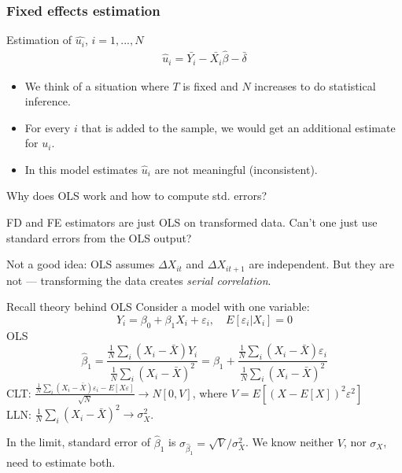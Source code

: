 \documentclass[notes=show,beamer,compress]{beamer}
\begin{document}

\begin{frame}
\frametitle{Fixed effects estimation}

Estimation of $\hat{u_{i}}$, $i=1,...,N$
\begin{eqnarray*}
\hat{u}_{i}=\bar{Y_i}-\bar{X_i}\hat{\beta}-\bar{\delta}
\end{eqnarray*}

\begin{itemize}
\item We think of a situation where $T$ is fixed and $N$ increases to do statistical inference.
\item For every $i$ that is added to the sample, we would get an additional estimate for $u_i$.
\item In this model estimates $\hat{u}_{i}$ are not meaningful (inconsistent).
\end{itemize}
\end{frame}


\begin{frame}{Why does OLS work and how to compute std. errors?}

FD and FE estimators are just OLS on transformed data. Can't one just use standard errors from the OLS output?\\\bigskip

Not a good idea: OLS assumes $\Delta{}X_{it}$ and $\Delta{}X_{it+1}$ are independent. But they are not --- transforming the data creates \emph{serial correlation}.

\end{frame}

\begin{frame}{Recall theory behind OLS}
Consider a model with one variable:
\begin{equation*}
	Y_i = \beta_0 + \beta_1X_i + \varepsilon_i, \quad E[\varepsilon_i|X_i]=0
\end{equation*}
OLS
\begin{equation*}
	\widehat\beta_1 = \frac{\frac{1}{N}\sum_i(X_i - \bar{X})Y_i}{\frac{1}{N}\sum_i(X_i - \bar{X})^2} = \beta_1 + \frac{\frac{1}{N}\sum_i(X_i - \bar{X})\varepsilon_i}{\frac{1}{N}\sum_i(X_i - \bar{X})^2}
\end{equation*}
CLT: $\frac{\frac{1}{N}\sum_i(X_i - \bar{X})\varepsilon_i - E[X\varepsilon]}{\sqrt{N}} \to N[0, V]$, where $V = E[(X-E[X])^2\varepsilon^2]$\\
LLN: $\frac{1}{N}\sum_i(X_i - \bar{X})^2 \to \sigma^2_X$.\\\bigskip

In the limit, standard error of $\widehat\beta_1$ is $\sigma_{\widehat\beta_1} = \sqrt{V}/\sigma^2_X$. We know neither $V$, nor $\sigma_X$, need to estimate both.
\end{frame}
\end{document}
